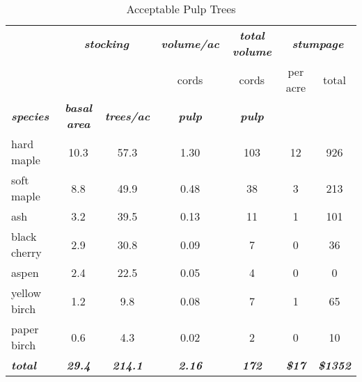 \documentclass[landscape]{article}
\begin{document}
\begin{table}[H]

\caption{\label{tab:unnamed-chunk-14}Acceptable Pulp Trees}
\fontsize{10}{12}\selectfont
\begin{tabular}[t]{lcccccc}
\toprule
\multicolumn{1}{c}{\em{\textbf{ }}} & \multicolumn{2}{c}{\em{\textbf{stocking}}} & \multicolumn{1}{c}{\em{\textbf{volume/ac }}} & \multicolumn{1}{c}{\em{\textbf{total volume}}} & \multicolumn{2}{c}{\em{\textbf{stumpage}}} \\
\cmidrule(l{3pt}r{3pt}){2-3} \cmidrule(l{3pt}r{3pt}){4-4} \cmidrule(l{3pt}r{3pt}){5-5} \cmidrule(l{3pt}r{3pt}){6-7}
\multicolumn{3}{c}{ } & \multicolumn{1}{c}{cords} & \multicolumn{1}{c}{cords} & \multicolumn{1}{c}{per acre} & \multicolumn{1}{c}{total} \\
\cmidrule(l{3pt}r{3pt}){4-4} \cmidrule(l{3pt}r{3pt}){5-5} \cmidrule(l{3pt}r{3pt}){6-6} \cmidrule(l{3pt}r{3pt}){7-7}
\rowcolor[HTML]{DCDCDC}  \em{\textbf{species}} & \em{\textbf{basal area}} & \em{\textbf{trees/ac}} & \em{\textbf{pulp}} & \em{\textbf{pulp}} & \em{\textbf{ }} & \em{\textbf{ }}\\
\midrule
\rowcolor{gray!6}  hard maple & 10.3 & 57.3 & 1.30 & 103 & 12 & 926\\
 
soft maple & 8.8 & 49.9 & 0.48 & 38 & 3 & 213\\
 
\rowcolor{gray!6}  ash & 3.2 & 39.5 & 0.13 & 11 & 1 & 101\\
 
black cherry & 2.9 & 30.8 & 0.09 & 7 & 0 & 36\\
 
\rowcolor{gray!6}  aspen & 2.4 & 22.5 & 0.05 & 4 & 0 & 0\\
 
yellow birch & 1.2 & 9.8 & 0.08 & 7 & 1 & 65\\
 
\rowcolor{gray!6}  paper birch & 0.6 & 4.3 & 0.02 & 2 & 0 & 10\\
 
\rowcolor[HTML]{DCDCDC}  \em{\textbf{total}} & \em{\textbf{29.4}} & \em{\textbf{214.1}} & \em{\textbf{2.16}} & \em{\textbf{172}} & \em{\textbf{\$17}} & \em{\textbf{\$1352}}\\
\bottomrule
\end{tabular}
\end{table}
\end{document}
